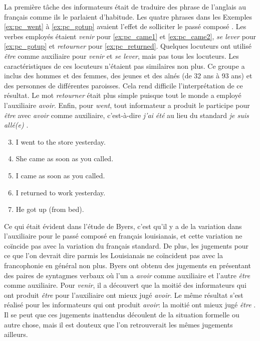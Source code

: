 \documentclass{article}
\newcommand{\lexi}[1]{\textit{#1}}
\begin{document}
    La première tâche des informateurs était de traduire des phrase de l'anglais au français comme ils le parlaient d'habitude.
    Les quatre phrases dans les Exemples \ref{ex:pc_went} à \ref{ex:pc_gotup} avaient l'effet de solliciter le passé composé \parencite[p.~198]{byers_defining_1988}.
    Les verbes employés étaient \lexi{venir} pour \ref{ex:pc_came1} et \ref{ex:pc_came2}, \lexi{se lever} pour \ref{ex:pc_gotup} et \lexi{retourner} pour \ref{ex:pc_returned}.
    Quelques locuteurs ont utilisé \lexi{être} comme auxiliaire pour \lexi{venir} et \lexi{se lever}, mais pas tous les locuteurs.
    Les caractéristiques de ces locuteurs n'étaient pas similaires non plus.
    Ce groupe a inclus des hommes et des femmes, des jeunes et des aînés (de 32 ans à 93 ans) et des personnes de différentes paroisses.
    Cela rend difficile l'interprétation de ce résultat.
    Le mot \lexi{retourner} était plus simple puisque tout le monde a employé l'auxiliaire \lexi{avoir}.
    Enfin, pour \lexi{went}, tout informateur a produit le participe pour \lexi{être} avec \lexi{avoir} comme auxiliaire, c'est-à-dire \lexi{j'ai été} au lieu du standard \lexi{je suis allé(e)} \parencite[pp.~84-85]{byers_defining_1988}.

    \begin{enumerate}
      \setcounter{enumi}{2}
      \item \label{ex:pc_went} I went to the store yesterday.
      \item \label{ex:pc_came1} She came as soon as you called.
      \item \label{ex:pc_came2} I came as soon as you called.
      \item \label{ex:pc_returned} I returned to work yesterday.
      \item \label{ex:pc_gotup} He got up (from bed).
    \end{enumerate}

    Ce qui était évident dans l'étude de Byers, c'est qu'il y a de la variation dans l'auxiliaire pour le passé composé en français louisianais, et cette variation ne coïncide pas avec la variation du français standard.
    De plus, les jugements pour ce que l'on devrait dire parmis les Louisianais ne coïncident pas avec la francophonie en général non plus.
    Byers ont obtenu des jugements en présentant des paires de syntagmes verbaux où l'un a \lexi{avoir} comme auxiliaire et l'autre \lexi{être} comme auxiliaire.
    Pour \lexi{venir}, il a découvert que la moitié des informateurs qui ont produit \lexi{être} pour l'auxiliaire ont mieux jugé \lexi{avoir}.
    Le même résultat s'est réalisé pour les informateurs qui ont produit \lexi{avoir}: la moitié ont mieux jugé \lexi{être} \parencite[pp.~128-132]{byers_defining_1988}.
    Il se peut que ces jugements inattendus découlent de la situation formelle ou autre chose, mais il est douteux que l'on retrouverait les mêmes jugements ailleurs.
\end{document}
